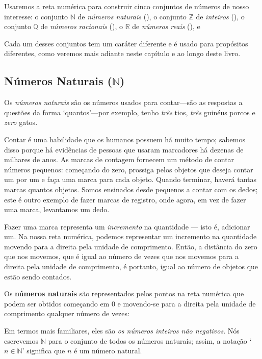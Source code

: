 Usaremos a reta numérica para construir cinco conjuntos de números de nosso interesse: o conjunto $\mathbb{N}$ de \textit{números naturais} (), o conjunto $\mathbb{Z}$ de \textit{inteiros} (), o conjunto $\mathbb{Q}$ de \textit{números racionais} (), o $\mathbb{R}$ de \textit{ números reais} (), e


Cada um desses conjuntos tem um caráter diferente e é usado para propósitos diferentes, como veremos mais adiante neste capítulo e ao longo deste livro.

\subsection*{Números Naturais ($\mathbb{N}$)}

Os \textit{números naturais} são os números usados para contar---são as respostas a questões da forma `quantos'---por exemplo, tenho \textit{três} tios, \textit{três} guinéus porcos e \textit{zero} gatos.

Contar é uma habilidade que os humanos possuem há muito tempo; sabemos disso porque há evidências de pessoas que usaram marcadores há dezenas de milhares de anos. As marcas de contagem fornecem um método de contar números pequenos: começando do zero, prossiga pelos objetos que deseja contar um por um e faça uma marca para cada objeto. Quando terminar, haverá tantas marcas quantos objetos. Somos ensinados desde pequenos a contar com os dedos; este é outro exemplo de fazer marcas de registro, onde agora, em vez de fazer uma marca, levantamos um dedo.

Fazer uma marca representa um \textit{incremento} na quantidade --- isto é, adicionar um. Na nossa reta numérica, podemos representar um incremento na quantidade movendo para a direita pela unidade de comprimento. Então, a distância do zero que nos movemos, que é igual ao número de vezes que nos movemos para a direita pela unidade de comprimento, é portanto, igual ao número de objetos que estão sendo contados.

\begin{definition}
\label{defNaturalNumbersInformal}
Os \textbf{números naturais} são representados pelos pontos na reta numérica que podem ser obtidos começando em $0$ e movendo-se para a direita pela unidade de comprimento qualquer número de vezes:
\begin{center}
\end{center}
Em termos mais familiares, eles são  \textit{os números inteiros não negativos}. Nós escrevemos $\mathbb{N}$  para o conjunto de todos os números naturais; assim, a notação `$n \in \mathbb{N}$' significa que $n$ é um número natural.
\end{definition}

